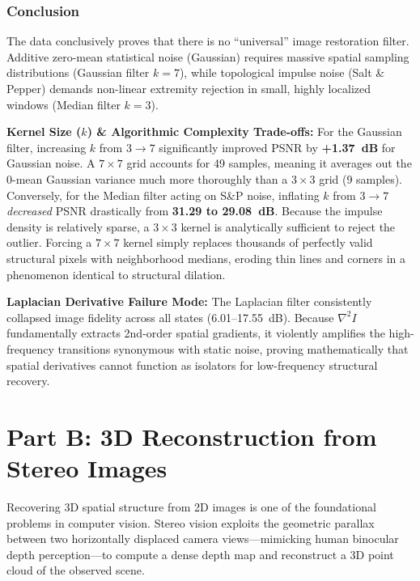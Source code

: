\documentclass[a4paper,12pt]{article}
\begin{document}
\subsubsection{Conclusion}

The data conclusively proves that there is no ``universal'' image restoration filter. Additive zero-mean statistical noise (Gaussian) requires massive spatial sampling distributions (Gaussian filter $k=7$), while topological impulse noise (Salt \& Pepper) demands non-linear extremity rejection in small, highly localized windows (Median filter $k=3$).

\textbf{Kernel Size ($k$) \& Algorithmic Complexity Trade-offs:} For the Gaussian filter, increasing $k$ from $3 \to 7$ significantly improved PSNR by \textbf{+1.37~dB} for Gaussian noise. A $7 \times 7$ grid accounts for 49 samples, meaning it averages out the 0-mean Gaussian variance much more thoroughly than a $3 \times 3$ grid (9 samples). Conversely, for the Median filter acting on S\&P noise, inflating $k$ from $3 \to 7$ \textit{decreased} PSNR drastically from \textbf{31.29 to 29.08~dB}. Because the impulse density is relatively sparse, a $3 \times 3$ kernel is analytically sufficient to reject the outlier. Forcing a $7 \times 7$ kernel simply replaces thousands of perfectly valid structural pixels with neighborhood medians, eroding thin lines and corners in a phenomenon identical to structural dilation.

\textbf{Laplacian Derivative Failure Mode:} The Laplacian filter consistently collapsed image fidelity across all states (6.01--17.55~dB). Because $\nabla^2 I$ fundamentally extracts 2nd-order spatial gradients, it violently amplifies the high-frequency transitions synonymous with static noise, proving mathematically that spatial derivatives cannot function as isolators for low-frequency structural recovery.

\section{Part B: 3D Reconstruction from Stereo Images}

Recovering 3D spatial structure from 2D images is one of the foundational problems in computer vision. Stereo vision exploits the geometric parallax between two horizontally displaced camera views---mimicking human binocular depth perception---to compute a dense depth map and reconstruct a 3D point cloud of the observed scene.
\end{document}
